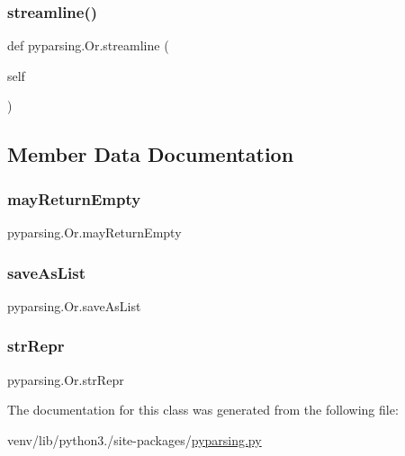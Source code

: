 \subsubsection{\texorpdfstring{streamline()}{streamline()}}
{\footnotesize\ttfamily def pyparsing.\+Or.\+streamline (\begin{DoxyParamCaption}\item[{}]{self }\end{DoxyParamCaption})}



\subsection{Member Data Documentation}
\mbox{\label{classpyparsing_1_1Or_a4f703a6a209f8308c55ca5070309bf40}} 
\subsubsection{\texorpdfstring{may\+Return\+Empty}{mayReturnEmpty}}
{\footnotesize\ttfamily pyparsing.\+Or.\+may\+Return\+Empty}

\mbox{\label{classpyparsing_1_1Or_adbf4f1a3c56f5d74365edbbe89ce40d3}} 
\subsubsection{\texorpdfstring{save\+As\+List}{saveAsList}}
{\footnotesize\ttfamily pyparsing.\+Or.\+save\+As\+List}

\mbox{\label{classpyparsing_1_1Or_af37830587dcd6e29c614ec72f5500177}} 
\subsubsection{\texorpdfstring{str\+Repr}{strRepr}}
{\footnotesize\ttfamily pyparsing.\+Or.\+str\+Repr}



The documentation for this class was generated from the following file\+:\begin{DoxyCompactItemize}
\item 
venv/lib/python3./site-\/packages/\hyperlink{pyparsing_8py}{pyparsing.\+py}\end{DoxyCompactItemize}
